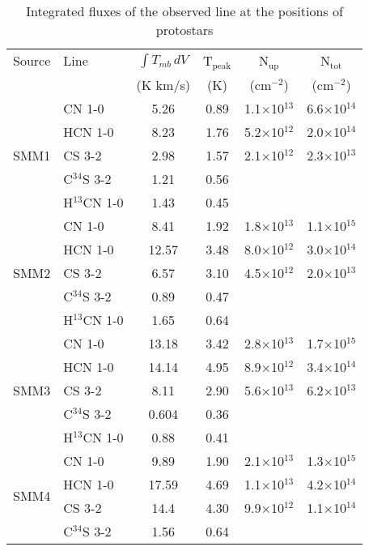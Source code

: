 \documentclass{aa}
\begin{document}
\begin{table*}
\caption{Integrated fluxes of the observed line at the positions of protostars}             %
\label{table:fluxes}      %
\centering                          %
\begin{tabular}{l l c c c c} 
\hline\hline 
Source & Line & $\int{T_{mb} \, dV}$ & T$_\mathrm{peak}$ & N$_\mathrm{up}$ & N$_\mathrm{tot}$\\
 &  & (K km/s) & (K) & (cm$^{-2}$) & (cm$^{-2}$) \\
\hline  
\multirow{5}{*}{SMM1} & CN 1-0 & 5.26 & 0.89 & 1.1$\times$10$^{13}$ & 6.6$\times$10$^{14}$\\
{} & HCN 1-0 & 8.23 & 1.76 & 5.2$\times$10$^{12}$ & 2.0$\times$10$^{14}$\\ 
{} & CS 3-2 & 2.98 & 1.57 & 2.1$\times$10$^{12}$ & 2.3$\times$10$^{13}$\\  
{} & C$^{34}$S 3-2 & 1.21 & 0.56 &  & \\ 
{} & H$^{13}$CN 1-0 & 1.43 & 0.45 &  & \\ 
\hline
\multirow{5}{*}{SMM2} & CN 1-0 & 8.41 & 1.92 & 1.8$\times$10$^{13}$ & 1.1$\times$10$^{15}$ \\
{} & HCN 1-0 & 12.57 & 3.48 & 8.0$\times$10$^{12}$ & 3.0$\times$10$^{14}$\\ 
{} & CS 3-2 & 6.57 & 3.10 & 4.5$\times$10$^{12}$ & 2.0$\times$10$^{13}$\\  
{} & C$^{34}$S 3-2 & 0.89 & 0.47 & &\\
{} & H$^{13}$CN 1-0 & 1.65 & 0.64 &  & \\ 
\hline
\multirow{5}{*}{SMM3} & CN 1-0 & 13.18 & 3.42 & 2.8$\times$10$^{13}$ & 1.7$\times$10$^{15}$\\
{} & HCN 1-0 & 14.14 & 4.95 & 8.9$\times$10$^{12}$ & 3.4$\times$10$^{14}$\\ 
{} & CS 3-2 & 8.11 & 2.90 & 5.6$\times$10$^{13}$ & 6.2$\times$10$^{13}$ \\  
{} & C$^{34}$S 3-2 & 0.604 & 0.36 &  & \\
{} & H$^{13}$CN 1-0 & 0.88 & 0.41 &  & \\ 
\hline
\multirow{5}{*}{SMM4} & CN 1-0 & 9.89 & 1.90 & 2.1$\times$10$^{13}$ & 1.3$\times$10$^{15}$\\
{} & HCN 1-0 & 17.59 & 4.69 & 1.1$\times$10$^{13}$ & 4.2$\times$10$^{14}$\\ 
{} & CS 3-2 & 14.4 & 4.30 & 9.9$\times$10$^{12}$ & 1.1$\times$10$^{14}$\\  
{} & C$^{34}$S 3-2 & 1.56 & 0.64 & &\\ 

\end{tabular}
\end{table*}
\end{document}
